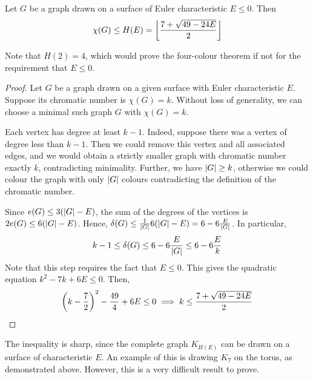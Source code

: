 \begin{theorem}[Heawood]
	Let \( G \) be a graph drawn on a surface of Euler characteristic \( E \leq 0 \).
	Then
	\[ \chi(G) \leq H(E) = \floor*{\frac{7+\sqrt{49-24E}}{2}} \]
\end{theorem}
\begin{remark}
	Note that \( H(2) = 4 \), which would prove the four-colour theorem if not for the requirement that \( E \leq 0 \).
\end{remark}
\begin{proof}
	Let \( G \) be a graph drawn on a given surface with Euler characteristic \( E \).
	Suppose its chromatic number is \( \chi(G) = k \).
	Without loss of generality, we can choose a minimal such graph \( G \) with \( \chi(G) = k \).

	Each vertex has degree at least \( k - 1 \).
	Indeed, suppose there was a vertex of degree less than \( k - 1 \).
	Then we could remove this vertex and all associated edges, and we would obtain a strictly smaller graph with chromatic number exactly \( k \), contradicting minimality.
	Further, we have \( \abs{G} \geq k \), otherwise we could colour the graph with only \( \abs{G} \) colours contradicting the definition of the chromatic number.

	Since \( e(G) \leq 3(\abs{G} - E) \), the sum of the degrees of the vertices is \( 2e(G) \leq 6(\abs{G} - E) \).
	Hence, \( \delta(G) \leq \frac{1}{\abs{G}} 6(\abs{G} - E) = 6 - 6\frac{E}{\abs{G}} \).
	In particular,
	\[ k - 1 \leq \delta(G) \leq 6 - 6\frac{E}{\abs{G}} \leq 6 - 6\frac{E}{k} \]
	Note that this step requires the fact that \( E \leq 0 \).
	This gives the quadratic equation \( k^2 - 7k + 6E \leq 0 \).
	Then,
	\[ \qty(k - \frac{7}{2})^2 - \frac{49}{4} + 6E \leq 0 \implies k \leq \frac{7 + \sqrt{49 - 24E}}{2} \]
\end{proof}
\begin{remark}
	The inequality is sharp, since the complete graph \( K_{H(E)} \) can be drawn on a surface of characteristic \( E \).
	An example of this is drawing \( K_7 \) on the torus, as demonstrated above.
	However, this is a very difficult result to prove.
\end{remark}
